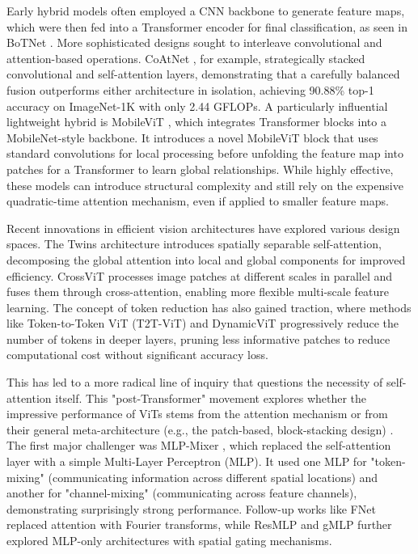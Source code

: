 \documentclass[12pt, a4paper]{article}
\begin{document}
Early hybrid models often employed a CNN backbone to generate feature maps, which were then fed into a Transformer encoder for final classification, as seen in BoTNet \cite{srinivas2021bottleneck}. More sophisticated designs sought to interleave convolutional and attention-based operations. CoAtNet \cite{dai2021coatnet}, for example, strategically stacked convolutional and self-attention layers, demonstrating that a carefully balanced fusion outperforms either architecture in isolation, achieving 90.88\% top-1 accuracy on ImageNet-1K with only 2.44 GFLOPs. A particularly influential lightweight hybrid is MobileViT \cite{mehta2021mobilevit}, which integrates Transformer blocks into a MobileNet-style backbone. It introduces a novel MobileViT block that uses standard convolutions for local processing before unfolding the feature map into patches for a Transformer to learn global relationships. While highly effective, these models can introduce structural complexity and still rely on the expensive quadratic-time attention mechanism, even if applied to smaller feature maps.

Recent innovations in efficient vision architectures have explored various design spaces. The Twins architecture \cite{chu2021twins} introduces spatially separable self-attention, decomposing the global attention into local and global components for improved efficiency. CrossViT \cite{chen2021crossvit} processes image patches at different scales in parallel and fuses them through cross-attention, enabling more flexible multi-scale feature learning. The concept of token reduction has also gained traction, where methods like Token-to-Token ViT (T2T-ViT) \cite{yuan2021tokens} and DynamicViT \cite{rao2021dynamicvit} progressively reduce the number of tokens in deeper layers, pruning less informative patches to reduce computational cost without significant accuracy loss.

This has led to a more radical line of inquiry that questions the necessity of self-attention itself. This "post-Transformer" movement explores whether the impressive performance of ViTs stems from the attention mechanism or from their general meta-architecture (e.g., the patch-based, block-stacking design) \cite{yu2022metaformer}. The first major challenger was MLP-Mixer \cite{tolstikhin2021mlp}, which replaced the self-attention layer with a simple Multi-Layer Perceptron (MLP). It used one MLP for "token-mixing" (communicating information across different spatial locations) and another for "channel-mixing" (communicating across feature channels), demonstrating surprisingly strong performance. Follow-up works like FNet \cite{leethorp2021fnet} replaced attention with Fourier transforms, while ResMLP \cite{touvron2021resmlp} and gMLP \cite{liu2021pay} further explored MLP-only architectures with spatial gating mechanisms.
\end{document}
